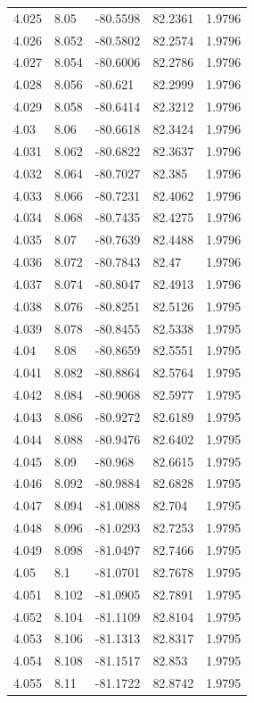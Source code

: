 \begin{tabular}{lllll}
4.025 & 8.05 & -80.5598 & 82.2361 & 1.9796 \\
4.026 & 8.052 & -80.5802 & 82.2574 & 1.9796 \\
4.027 & 8.054 & -80.6006 & 82.2786 & 1.9796 \\
4.028 & 8.056 & -80.621 & 82.2999 & 1.9796 \\
4.029 & 8.058 & -80.6414 & 82.3212 & 1.9796 \\
4.03 & 8.06 & -80.6618 & 82.3424 & 1.9796 \\
4.031 & 8.062 & -80.6822 & 82.3637 & 1.9796 \\
4.032 & 8.064 & -80.7027 & 82.385 & 1.9796 \\
4.033 & 8.066 & -80.7231 & 82.4062 & 1.9796 \\
4.034 & 8.068 & -80.7435 & 82.4275 & 1.9796 \\
4.035 & 8.07 & -80.7639 & 82.4488 & 1.9796 \\
4.036 & 8.072 & -80.7843 & 82.47 & 1.9796 \\
4.037 & 8.074 & -80.8047 & 82.4913 & 1.9796 \\
4.038 & 8.076 & -80.8251 & 82.5126 & 1.9795 \\
4.039 & 8.078 & -80.8455 & 82.5338 & 1.9795 \\
4.04 & 8.08 & -80.8659 & 82.5551 & 1.9795 \\
4.041 & 8.082 & -80.8864 & 82.5764 & 1.9795 \\
4.042 & 8.084 & -80.9068 & 82.5977 & 1.9795 \\
4.043 & 8.086 & -80.9272 & 82.6189 & 1.9795 \\
4.044 & 8.088 & -80.9476 & 82.6402 & 1.9795 \\
4.045 & 8.09 & -80.968 & 82.6615 & 1.9795 \\
4.046 & 8.092 & -80.9884 & 82.6828 & 1.9795 \\
4.047 & 8.094 & -81.0088 & 82.704 & 1.9795 \\
4.048 & 8.096 & -81.0293 & 82.7253 & 1.9795 \\
4.049 & 8.098 & -81.0497 & 82.7466 & 1.9795 \\
4.05 & 8.1 & -81.0701 & 82.7678 & 1.9795 \\
4.051 & 8.102 & -81.0905 & 82.7891 & 1.9795 \\
4.052 & 8.104 & -81.1109 & 82.8104 & 1.9795 \\
4.053 & 8.106 & -81.1313 & 82.8317 & 1.9795 \\
4.054 & 8.108 & -81.1517 & 82.853 & 1.9795 \\
4.055 & 8.11 & -81.1722 & 82.8742 & 1.9795 \\

\end{tabular}
